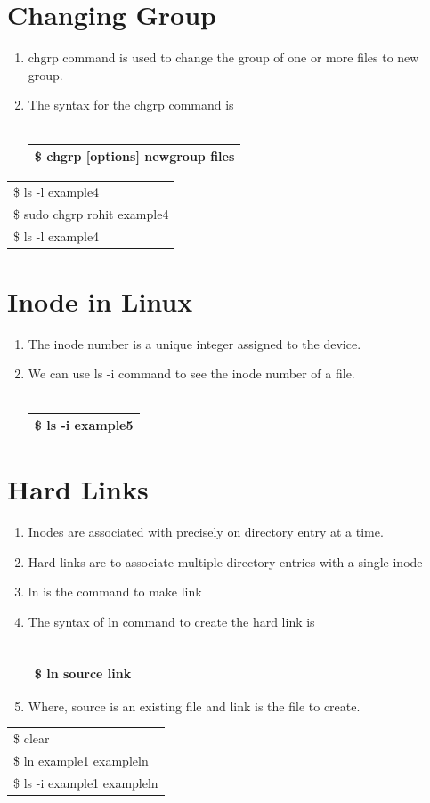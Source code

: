 \documentclass[12pt, a4paper]{report}
\begin{document}
\section{Changing Group}
\begin{enumerate}
\item chgrp command is used to change the group of one or more files to new group.
\item The syntax for the chgrp command is \\
\\
\begin{tabular}{|l|}\hline
\$ chgrp [options] newgroup files\\ \hline
\end{tabular}
\end{enumerate}
\begin{tabular}{|l|}\hline
\$ ls -l example4\\
\$ sudo chgrp rohit example4\\
\$ ls -l example4\\ \hline
\end{tabular}
\section{Inode in Linux}
\begin{enumerate}
\item The inode number is a unique integer assigned to the device.
\item We can use ls -i command to see the inode number of a file.\\
\\
\begin{tabular}{|l|}\hline
\$ ls -i example5 \\ \hline
\end{tabular}
\end{enumerate}
\section{Hard Links}
\begin{enumerate}
\item Inodes are associated with precisely on directory entry at a time.
\item Hard links are to associate multiple directory entries with a single inode
\item ln is the command to make link
\item The syntax of ln command to create the hard link is\\
\\ 
\begin{tabular}{|l|}\hline
\$ ln source link\\ \hline
\end{tabular}
\item Where, source is an existing file and link is the file to create.
\end{enumerate}
\begin{tabular}{|l|}\hline
\$ clear\\
\$ ln example1 exampleln\\
\$ ls -i example1 exampleln\\ \hline
\end{tabular}
\end{document}

